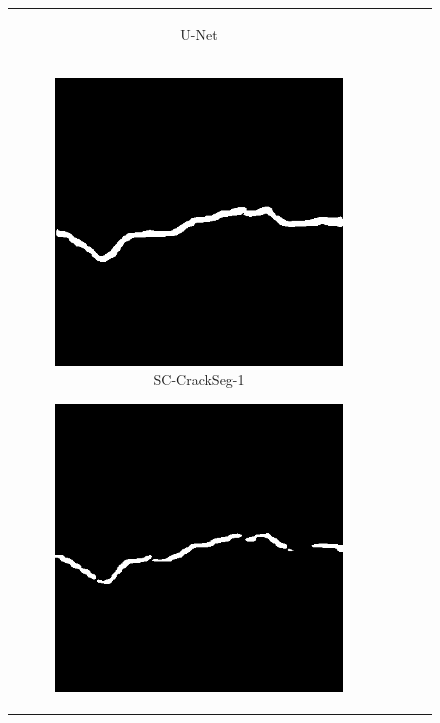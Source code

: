 \documentclass[a4paper,12pt]{report}
\begin{document}
\begin{figure}[htbp]
\begin{tabular}{cccc}
\begin{subfigure}[b]{0.23\textwidth}
            \caption{U-Net}
            \label{fig:crackseg-experiment-qualitative-unet}
        \end{subfigure}
        \\
        \begin{subfigure}[b]{0.23\textwidth}
            \centering
            \includegraphics[width=\textwidth]{res/crackseg-experiment-qualitative/sc-crackseg-1.png}
            \caption{SC-CrackSeg-1}
            \label{fig:crackseg-experiment-qualitative-sc-crackseg-1}
        \end{subfigure}
        \begin{subfigure}[b]{0.23\textwidth}
            \centering
            \includegraphics[width=\textwidth]{res/crackseg-experiment-qualitative/sc-crackseg-2.png}

\end{subfigure}
\end{tabular}
\end{figure}
\end{document}
